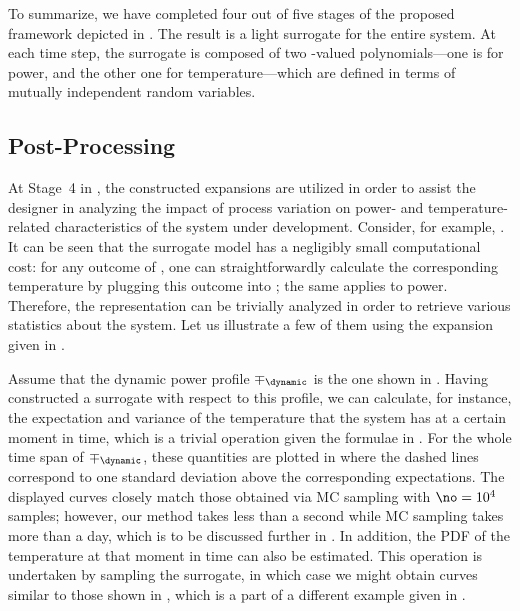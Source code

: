 To summarize, we have completed four out of five stages of the proposed
framework depicted in . The result is a light surrogate for
the entire system. At each time step, the surrogate is composed of two
\np-valued polynomials---one is for power, and the other one for
temperature---which are defined in terms of \nz mutually independent random
variables.

\subsection{Post-Processing}

At Stage~4 in , the constructed expansions are utilized in
order to assist the designer in analyzing the impact of process variation on
power- and temperature-related characteristics of the system under development.
Consider, for example, . It can be seen that the
surrogate model has a negligibly small computational cost: for any outcome of
\vz, one can straightforwardly calculate the corresponding temperature by
plugging this outcome into ; the same applies to
power. Therefore, the representation can be trivially analyzed in order to
retrieve various statistics about the system. Let us illustrate a few of them
using the expansion given in .

Assume that the dynamic power profile $\mp_\dynamic$ is the one shown in
. Having constructed a surrogate with respect to
this profile, we can calculate, for instance, the expectation and variance of
the temperature that the system has at a certain moment in time, which is a
trivial operation given the formulae in . For the whole time
span of $\mp_\dynamic$, these quantities are plotted in
 where the dashed lines correspond to one
standard deviation above the corresponding expectations. The displayed curves
closely match those obtained via \ac{MC} sampling with $\no = 10^4$ samples;
however, our method takes less than a second while \ac{MC} sampling takes more
than a day, which is to be discussed further in .
In addition, the \ac{PDF} of the temperature at that moment in time can also be
estimated. This operation is undertaken by sampling the surrogate, in which case
we might obtain curves similar to those shown in
, which is a part of a different example given
in .
